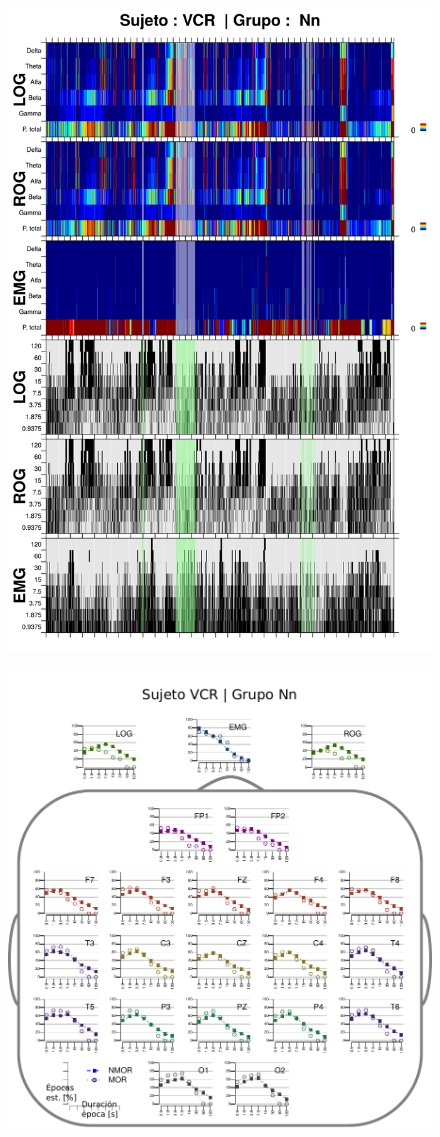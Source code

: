 \begin{figure}
\centering
\includegraphics[width=0.9\linewidth]
{./img_resultados/VCNNS1_combinado_.png} 
\end{figure}

\begin{figure}
\centering
\includegraphics[width=.9\linewidth]{./img_resultados/cabeza_VCR.pdf}
\end{figure}


